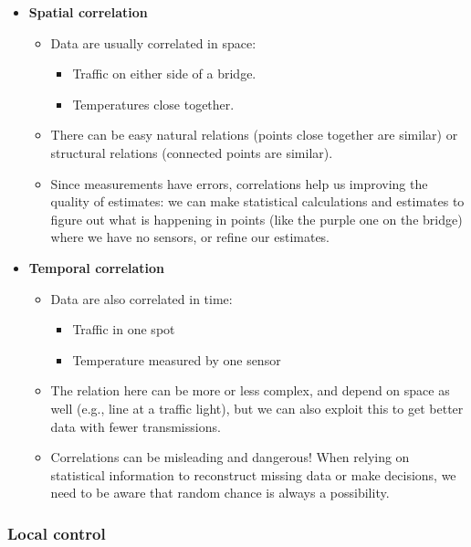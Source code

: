 \begin{itemize}
    \item \textbf{Spatial correlation}
    \begin{itemize}
        \item Data are usually correlated in space:
        \begin{itemize}
            \item Traffic on either side of a bridge.
            \item Temperatures close together.
        \end{itemize}
        \item There can be easy natural relations (points close together are similar) or structural relations (connected points are similar).
        \item Since measurements have errors, correlations help us improving the quality of estimates: we can make statistical calculations and estimates to figure out what is happening in points (like the purple one on the bridge) where we have no sensors, or refine our estimates.
    \end{itemize}
    
    \item \textbf{Temporal correlation}
    \begin{itemize}
        \item Data are also correlated in time:
        \begin{itemize}
            \item Traffic in one spot
            \item Temperature measured by one sensor
        \end{itemize}
        \item The relation here can be more or less complex, and depend on space as well (e.g., line at a traffic light), but we can also exploit this to get better data with fewer transmissions.
        \item Correlations can be misleading and dangerous! When relying on statistical information to reconstruct missing data or make decisions, we need to be aware that random chance is always a possibility.
    \end{itemize}
\end{itemize}

\subsubsection{Local control}

